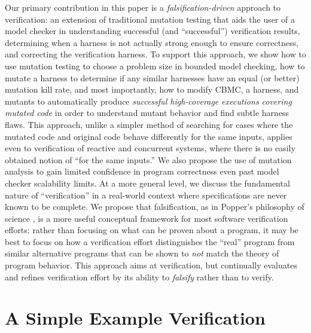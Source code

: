 \documentclass[conference]{IEEEtran}
\begin{document}
Our primary contribution in this paper is a
\emph{falsification-driven} approach to verification: an extension of
traditional mutation testing that aids the user of a model checker in
understanding successful (and ``successful'') verification results,
determining when a harness is not actually strong enough to ensure
correctness, and correcting the verification harness.  To support this
approach, we show how to use mutation testing to choose a problem size
in bounded model checking, how to mutate a harness to determine if any
similar harnesses have an equal (or better) mutation kill rate, and
most importantly, how to modify CBMC, a harness, and mutants to
automatically produce \emph{successful high-coverage executions
  covering mutated code} in order to understand mutant behavior and
find subtle harness flaws.  This approach, unlike a simpler method of
searching for cases where the mutated code and original code behave
differently for the same inputs, applies even to verification of
reactive and concurrent systems, where there is no easily obtained
notion of ``for the same inputs.''  We also propose the use of
mutation analysis to gain limited confidence in program correctness
even past model checker scalability limits. At a more general level,
we discuss the fundamental nature of ``verification'' in a real-world
context where specifications are never known to be complete. We
propose that falsification, as in Popper's philosophy of science \cite{Popper},
is a more useful conceptual framework for most software verification
efforts: rather than focusing on what can be proven about a program,
it may be best to focus on how a verification effort distinguishes the
``real'' program from similar alternative programs that can be shown
to \emph{not} match the theory of program behavior.  This approach
aims at verification, but continually evaluates and refines verification effort
by its ability to \emph{falsify} rather than to verify.

\section{A Simple Example Verification}
\end{document}
